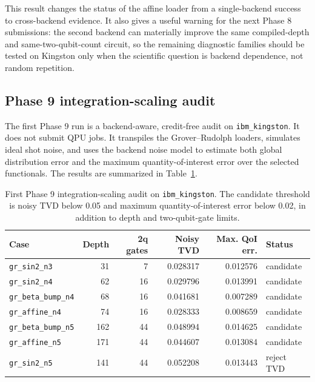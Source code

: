This result changes the status of the affine loader from a single-backend
success to cross-backend evidence. It also gives a useful warning for the next
Phase 8 submissions: the second backend can materially improve the same
compiled-depth and same-two-qubit-count circuit, so the remaining diagnostic
families should be tested on Kingston only when the scientific question is
backend dependence, not random repetition.

\subsection{Phase 9 integration-scaling audit}

The first Phase 9 run is a backend-aware, credit-free audit on
\texttt{ibm\_kingston}. It does not submit QPU jobs. It transpiles the
Grover--Rudolph loaders, simulates ideal shot noise, and uses the backend noise
model to estimate both global distribution error and the maximum
quantity-of-interest error over the selected functionals. The results are
summarized in Table~\ref{tab:phase9-first-audit}.

\begin{table}[h]
\centering
\begin{tabular}{lrrrrl}
\toprule
Case & Depth & 2q gates & Noisy TVD & Max. QoI err. & Status \\
\midrule
\texttt{gr\_sin2\_n3} & 31 & 7 & 0.028317 & 0.012576 & candidate \\
\texttt{gr\_sin2\_n4} & 62 & 16 & 0.029796 & 0.013991 & candidate \\
\texttt{gr\_beta\_bump\_n4} & 68 & 16 & 0.041681 & 0.007289 & candidate \\
\texttt{gr\_affine\_n4} & 74 & 16 & 0.028333 & 0.008659 & candidate \\
\texttt{gr\_beta\_bump\_n5} & 162 & 44 & 0.048994 & 0.014625 & candidate \\
\texttt{gr\_affine\_n5} & 171 & 44 & 0.044607 & 0.013084 & candidate \\
\texttt{gr\_sin2\_n5} & 141 & 44 & 0.052208 & 0.013443 & reject TVD \\
\bottomrule
\end{tabular}
\caption{First Phase 9 integration-scaling audit on \texttt{ibm\_kingston}.
The candidate threshold is noisy TVD below 0.05 and maximum
quantity-of-interest error below 0.02, in addition to depth and two-qubit-gate
limits.}
\label{tab:phase9-first-audit}
\end{table}


